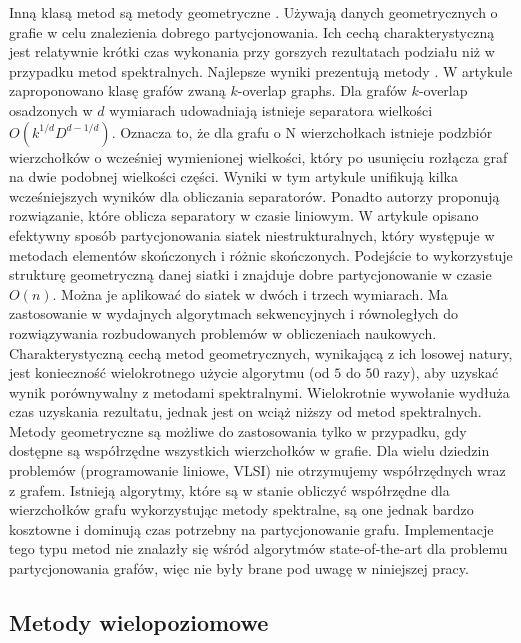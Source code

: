 Inną klasą metod są metody geometryczne
\cite{Miller1994ACP, Raghavan93lineand, 185417, MiTeThVa93, NourOmid1987SolvingFE}.
Używają danych geometrycznych o grafie w celu znalezienia dobrego partycjonowania.
Ich cechą charakterystyczną jest relatywnie krótki czas wykonania przy gorszych rezultatach podziału niż w przypadku metod spektralnych.
Najlepsze wyniki prezentują metody \cite{185417, MiTeThVa93}.
W artykule \cite{185417} zaproponowano klasę grafów zwaną $k$-overlap graphs. Dla grafów $k$-overlap osadzonych w $d$ wymiarach
 \cite{wiki:Graph_embedding} udowadniają istnieje separatora wielkości \(O(k^{1/d}D^{{d-1}/d})\).
Oznacza to, że dla grafu o N wierzchołkach istnieje podzbiór
wierzchołków o wcześniej wymienionej wielkości, który po usunięciu rozłącza graf na dwie podobnej wielkości części.
Wyniki w tym artykule unifikują kilka wcześniejszych wyników dla obliczania separatorów.
Ponadto autorzy proponują rozwiązanie, które oblicza separatory w czasie liniowym.
W artykule \cite{MiTeThVa93} opisano efektywny sposób partycjonowania siatek niestrukturalnych, który występuje
w metodach elementów skończonych i różnic skończonych.
Podejście to wykorzystuje strukturę geometryczną danej siatki i znajduje
dobre partycjonowanie w czasie \(O(n)\).
Można je aplikować do siatek w dwóch i trzech wymiarach.
Ma zastosowanie
w wydajnych algorytmach sekwencyjnych i równoległych do rozwiązywania rozbudowanych problemów w obliczeniach naukowych.
Charakterystyczną cechą metod geometrycznych, wynikającą z ich losowej natury, jest konieczność wielokrotnego użycie algorytmu
(od $5$ do $50$ razy), aby uzyskać wynik porównywalny z metodami spektralnymi.
Wielokrotnie wywołanie wydłuża czas uzyskania rezultatu, jednak jest
on wciąż niższy od metod spektralnych.
Metody geometryczne są możliwe do zastosowania tylko w przypadku, gdy dostępne
są współrzędne wszystkich wierzchołków w grafie.
Dla wielu dziedzin problemów (programowanie liniowe, VLSI)
nie otrzymujemy współrzędnych wraz z grafem.
Istnieją algorytmy, które są w stanie obliczyć współrzędne dla
wierzchołków grafu \cite{Chan95geometricspectral} wykorzystując metody spektralne, są one jednak bardzo kosztowne i
dominują czas potrzebny na partycjonowanie grafu.
Implementacje tego typu metod nie znalazły się wśród algorytmów state-of-the-art dla problemu partycjonowania grafów,
więc nie były brane pod uwagę w niniejszej pracy.

\newpage

\subsection{Metody wielopoziomowe}


